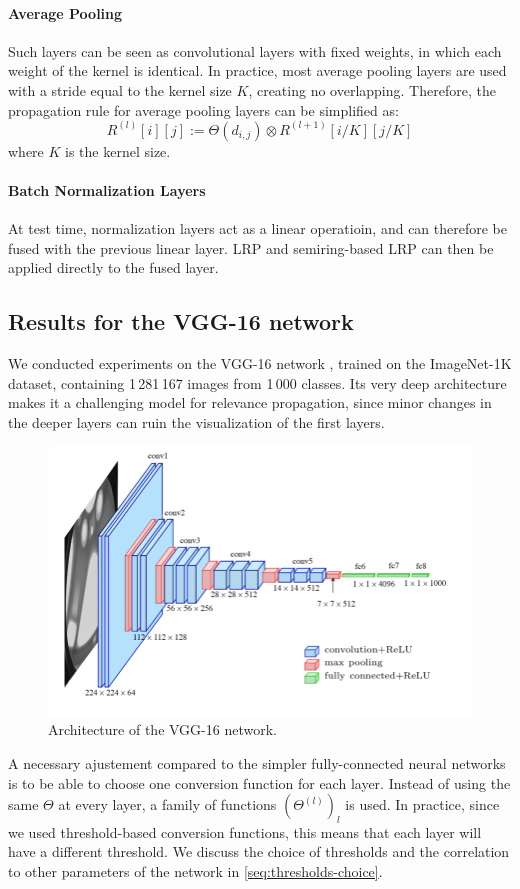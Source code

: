 \documentclass{../cs-classes/cs-classes}
\newcommand*{\1}{\digitsbb{1}}
\newcommand*{\0}{\digitsbb{0}}
\begin{document}
\paragraph*{Average Pooling}
Such layers can be seen as convolutional layers with fixed weights, in which each weight of the kernel is identical. In practice, most average pooling layers are used with a stride equal to the kernel size $K$, creating no overlapping. Therefore, the propagation rule for average pooling layers can be simplified as:
\begin{equation}
    R^{(l)}[i][j] := \Theta(d_{i,j}) \otimes R^{(l+1)}[i/K][j/K]
\end{equation}
where $K$ is the kernel size.

\paragraph*{Batch Normalization Layers}
At test time, normalization layers act as a linear operatioin, and can therefore be fused with the previous linear layer. LRP and semiring-based LRP can then be applied directly to the fused layer.

\subsection{Results for the VGG-16 network}
We conducted experiments on the VGG-16 network \cite{vgg}, trained on the ImageNet-1K dataset, containing 1\,281\,167 images from 1\,000 classes. Its very deep architecture makes it a challenging model for relevance propagation, since minor changes in the deeper layers can ruin the visualization of the first layers.
\begin{figure}[H]
    \centering
    \includegraphics[width=.6\textwidth]{vgg-architecture.png}
    \caption{Architecture of the VGG-16 network.}
\end{figure}
A necessary ajustement compared to the simpler fully-connected neural networks is to be able to choose one conversion function for each layer. Instead of using the same $\Theta$ at every layer, a family of functions $(\Theta^{(l)})_l$ is used. In practice, since we used threshold-based conversion functions, this means that each layer will have a different threshold. We discuss the choice of thresholds and the correlation to other parameters of the network in \autoref{seq:thresholds-choice}.
\end{document}
